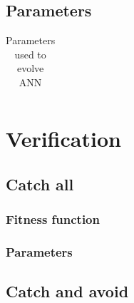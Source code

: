 \documentclass[10pt]{article}
\begin{document}
	
	\subsection{Parameters}
		\begin{table}
			\begin{tabular}{ll}
			\end{tabular}
			\caption{Parameters used to evolve ANN}
		\end{table}
\section{Verification}
	\subsection{Catch all}
		\subsubsection{Fitness function}
		\subsubsection{Parameters}
	\subsection{Catch and avoid}
\end{document}
